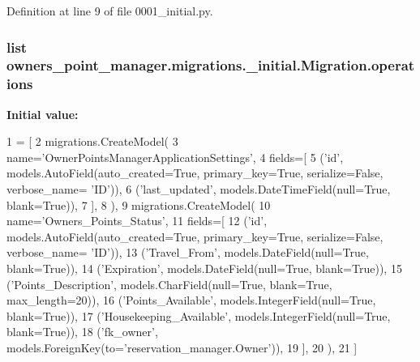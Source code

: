 Definition at line 9 of file 0001\-\_\-initial.\-py.

\hypertarget{classowners__point__manager_1_1migrations_1_10001__initial_1_1Migration_a2f1f70b01d6da09085a0a645cfbde222}{
\subsubsection[{operations}]{\setlength{\rightskip}{0pt plus 5cm}list owners\-\_\-point\-\_\-manager.\-migrations.\-\_\-initial.\-Migration.\-operations\hspace{0.3cm}{\ttfamily [static]}}}\label{classowners__point__manager_1_1migrations_1_10001__initial_1_1Migration_a2f1f70b01d6da09085a0a645cfbde222}
{\bfseries Initial value\-:}
\begin{DoxyCode}
1 = [
2         migrations.CreateModel(
3             name=\textcolor{stringliteral}{'OwnerPointsManagerApplicationSettings'},
4             fields=[
5                 (\textcolor{stringliteral}{'id'}, models.AutoField(auto\_created=\textcolor{keyword}{True}, primary\_key=\textcolor{keyword}{True}, serialize=\textcolor{keyword}{False}, verbose\_name=\textcolor{stringliteral}{
      'ID'})),
6                 (\textcolor{stringliteral}{'last\_updated'}, models.DateTimeField(null=\textcolor{keyword}{True}, blank=\textcolor{keyword}{True})),
7             ],
8         ),
9         migrations.CreateModel(
10             name=\textcolor{stringliteral}{'Owners\_Points\_Status'},
11             fields=[
12                 (\textcolor{stringliteral}{'id'}, models.AutoField(auto\_created=\textcolor{keyword}{True}, primary\_key=\textcolor{keyword}{True}, serialize=\textcolor{keyword}{False}, verbose\_name=\textcolor{stringliteral}{
      'ID'})),
13                 (\textcolor{stringliteral}{'Travel\_From'}, models.DateField(null=\textcolor{keyword}{True}, blank=\textcolor{keyword}{True})),
14                 (\textcolor{stringliteral}{'Expiration'}, models.DateField(null=\textcolor{keyword}{True}, blank=\textcolor{keyword}{True})),
15                 (\textcolor{stringliteral}{'Points\_Description'}, models.CharField(null=\textcolor{keyword}{True}, blank=\textcolor{keyword}{True}, max\_length=20)),
16                 (\textcolor{stringliteral}{'Points\_Available'}, models.IntegerField(null=\textcolor{keyword}{True}, blank=\textcolor{keyword}{True})),
17                 (\textcolor{stringliteral}{'Housekeeping\_Available'}, models.IntegerField(null=\textcolor{keyword}{True}, blank=\textcolor{keyword}{True})),
18                 (\textcolor{stringliteral}{'fk\_owner'}, models.ForeignKey(to=\textcolor{stringliteral}{'reservation\_manager.Owner'})),
19             ],
20         ),
21     ]
\end{DoxyCode}


